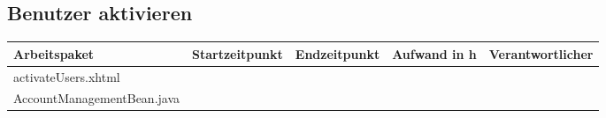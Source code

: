 \begin{landscape}
	\subsection{Benutzer aktivieren}
	\begin{tabular}{|p{10cm}|p{4cm}|p{3cm}|p{3cm}|p{3cm}|}
		\hline  \textbf{Arbeitspaket} & \textbf{Startzeitpunkt} & \textbf{Endzeitpunkt} & \textbf{Aufwand in h} & \textbf{Verantwortlicher} \\ 
		\hline   activateUsers.xhtml                                 &                            &                             &                     &\\
		\hline   AccountManagementBean.java                              &                            &                             &                     &\\
		\hline 
	\end{tabular} \ \\
	\ \\
	

\end{landscape}
